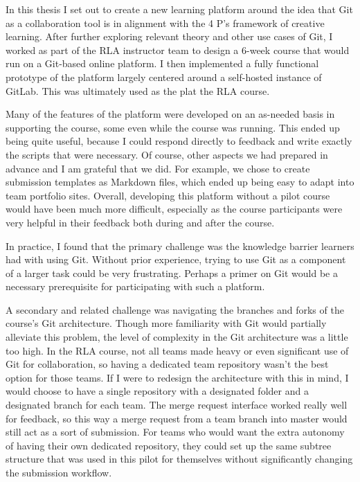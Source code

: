 \documentclass[12pt,twoside]{mitthesis}
\newcommand{\review}[1]{{\color{mygreen} #1}}
\begin{document}
\review{In this thesis I set out to create a new learning platform around the idea that Git as a collaboration tool is in alignment with the 4 P's framework of creative learning. After further exploring relevant theory and other use cases of Git, I worked as part of the RLA instructor team to design a 6-week course that would run on a Git-based online platform. I then implemented a fully functional prototype of the platform largely centered around a self-hosted instance of GitLab. This was ultimately used as the plat the RLA course.

Many of the features of the platform were developed on an as-needed basis in supporting the course, some even while the course was running. This ended up being quite useful, because I could respond directly to feedback and write exactly the scripts that were necessary. Of course, other aspects we had prepared in advance and I am grateful that we did. For example, we chose to create submission templates as Markdown files, which ended up being easy to adapt into team portfolio sites. Overall, developing this platform without a pilot course would have been much more difficult, especially as the course participants were very helpful in their feedback both during and after the course.

In practice, I found that the primary challenge was the knowledge barrier learners had with using Git. Without prior experience, trying to use Git as a component of a larger task could be very frustrating. Perhaps a primer on Git would be a necessary prerequisite for participating with such a platform. 

A secondary and related challenge was navigating the branches and forks of the course's Git architecture. Though more familiarity with Git would partially alleviate this problem, the level of complexity in the Git architecture was a little too high. In the RLA course, not all teams made heavy or even significant use of Git for collaboration, so having a dedicated team repository wasn't the best option for those teams. If I were to redesign the architecture with this in mind, I would choose to have a single repository with a designated folder and a designated branch for each team. The merge request interface worked really well for feedback, so this way a merge request from a team branch into master would still act as a sort of submission. For teams who would want the extra autonomy of having their own dedicated repository, they could set up the same subtree structure that was used in this pilot for themselves without significantly changing the submission workflow.

}
\end{document}
